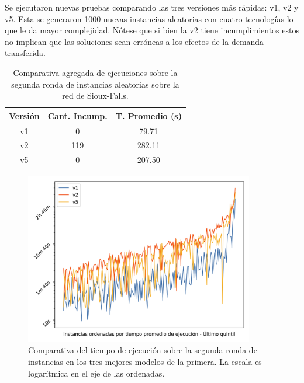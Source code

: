 \documentclass{article}
\begin{document}
  Se ejecutaron nuevas pruebas comparando las tres versiones más rápidas: v1, v2 y v5. Esta se generaron 1000 nuevas instancias aleatorias con cuatro tecnologías lo que le da mayor complejidad. Nótese que si bien la v2 tiene incumplimientos estos no implican que las soluciones sean erróneas a los efectos de la demanda transferida.


  \begin{table}[h!]
    \centering
    \begin{tabular}{ccc}
      \toprule
      Versión & Cant. Incump. & T. Promedio (s) \\
      \midrule
      v1 & 0   & 79.71   \\
      v2 & 119 & 282.11  \\
      v5 & 0   & 207.50  \\
      \bottomrule
    \end{tabular}
    \caption{Comparativa agregada de ejecuciones sobre la segunda ronda de instancias aleatorias sobre la red de Sioux-Falls.}\label{table:resumenreejecuciones}
  \end{table}

  \begin{figure}[h!]
    \centering
    \includegraphics[width=10cm]{../resources/run_time_comparsion_rerun.png}
    \caption{Comparativa del tiempo de ejecución sobre la segunda ronda de instancias en los tres mejores modelos de la primera. La escala es logarítmica en el eje de las ordenadas.} \label{fig:runtimecomparisonrerun}
  \end{figure}
\end{document}
